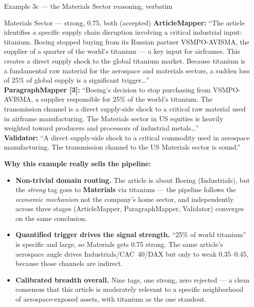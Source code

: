 \documentclass[10pt,aspectratio=169]{beamer}
\begin{document}
\begin{frame}{Example 3c --- the Materials Sector reasoning, verbatim}
  \scriptsize
  \begin{block}{Materials Sector --- strong, 0.75, both (\textcolor{goodgreen}{accepted})}
    \scriptsize
    \textbf{ArticleMapper:} ``The article identifies a specific supply chain disruption involving
    a critical industrial input: titanium. Boeing stopped buying from its Russian partner
    VSMPO-AVISMA, the supplier of a quarter of the world's titanium --- a key input for
    airframes. This creates a direct supply shock to the global titanium market. Because
    titanium is a fundamental raw material for the aerospace and materials sectors, a sudden
    loss of 25\% of global supply is a significant trigger\ldots'' \\[0.3em]
    \textbf{ParagraphMapper [3]:} ``Boeing's decision to stop purchasing from VSMPO-AVISMA,
    a supplier responsible for 25\% of the world's titanium. The transmission channel is a
    direct supply-side shock to a critical raw material used in airframe manufacturing. The
    Materials sector in US equities is heavily weighted toward producers and processors of
    industrial metals\ldots'' \\[0.3em]
    \textbf{Validator:} ``A direct supply-side shock to a critical commodity used in aerospace
    manufacturing. The transmission channel to the US Materials sector is sound.''
  \end{block}

  \vspace{0.3em}
  \textcolor{goodgreen}{\textbf{Why this example really sells the pipeline:}}
  \begin{itemize}\itemsep0.15em
    \item \textbf{Non-trivial domain routing.} The article is about Boeing (Industrials), but
          the \emph{strong} tag goes to \textbf{Materials} via titanium --- the pipeline
          follows the \emph{economic mechanism} not the company's home sector, and independently
          across three stages (ArticleMapper, ParagraphMapper, Validator) converges on the
          same conclusion.
    \item \textbf{Quantified trigger drives the signal strength.} ``25\% of world titanium''
          is specific and large, so Materials gets 0.75 strong. The same article's aerospace
          angle drives Industrials/CAC~40/DAX but only to weak 0.35--0.45, because those
          channels are indirect.
    \item \textbf{Calibrated breadth overall.} Nine tags, one strong, zero rejected --- a
          clean consensus that this article is moderately relevant to a specific neighborhood
          of aerospace-exposed assets, with titanium as the one standout.
  \end{itemize}
\end{frame}
\end{document}
